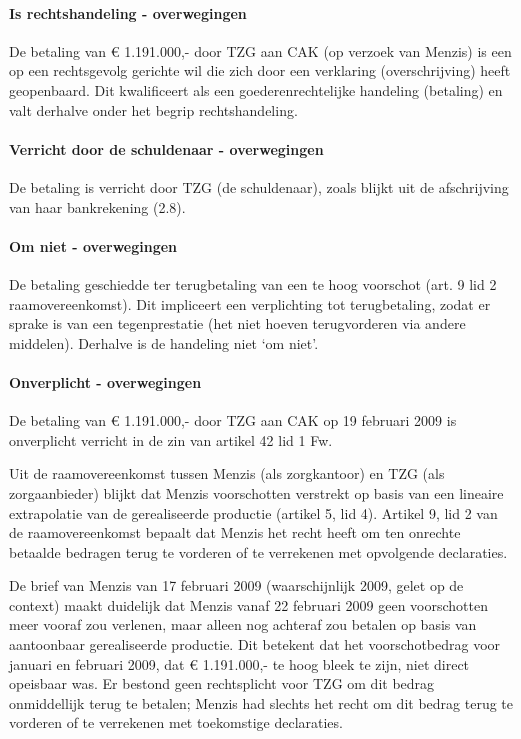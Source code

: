 \documentclass[
  dutch,
  a4paper,
]{article}
\begin{document}
\paragraph{Is rechtshandeling - overwegingen}\label{is-rechtshandeling---overwegingen-87}

De betaling van € 1.191.000,- door TZG aan CAK (op verzoek van Menzis) is een op een rechtsgevolg gerichte wil die zich door een verklaring (overschrijving) heeft geopenbaard. Dit kwalificeert als een goederenrechtelijke handeling (betaling) en valt derhalve onder het begrip rechtshandeling.

\paragraph{Verricht door de schuldenaar - overwegingen}\label{verricht-door-de-schuldenaar---overwegingen-87}

De betaling is verricht door TZG (de schuldenaar), zoals blijkt uit de afschrijving van haar bankrekening (2.8).

\paragraph{Om niet - overwegingen}\label{om-niet---overwegingen-87}

De betaling geschiedde ter terugbetaling van een te hoog voorschot (art. 9 lid 2 raamovereenkomst). Dit impliceert een verplichting tot terugbetaling, zodat er sprake is van een tegenprestatie (het niet hoeven terugvorderen via andere middelen). Derhalve is de handeling niet `om niet'.

\paragraph{Onverplicht - overwegingen}\label{onverplicht---overwegingen-87}

De betaling van € 1.191.000,- door TZG aan CAK op 19 februari 2009 is onverplicht verricht in de zin van artikel 42 lid 1 Fw.

Uit de raamovereenkomst tussen Menzis (als zorgkantoor) en TZG (als zorgaanbieder) blijkt dat Menzis voorschotten verstrekt op basis van een lineaire extrapolatie van de gerealiseerde productie (artikel 5, lid 4). Artikel 9, lid 2 van de raamovereenkomst bepaalt dat Menzis het recht heeft om ten onrechte betaalde bedragen terug te vorderen of te verrekenen met opvolgende declaraties.

De brief van Menzis van 17 februari 2009 (waarschijnlijk 2009, gelet op de context) maakt duidelijk dat Menzis vanaf 22 februari 2009 geen voorschotten meer vooraf zou verlenen, maar alleen nog achteraf zou betalen op basis van aantoonbaar gerealiseerde productie. Dit betekent dat het voorschotbedrag voor januari en februari 2009, dat € 1.191.000,- te hoog bleek te zijn, niet direct opeisbaar was. Er bestond geen rechtsplicht voor TZG om dit bedrag onmiddellijk terug te betalen; Menzis had slechts het recht om dit bedrag terug te vorderen of te verrekenen met toekomstige declaraties.
\end{document}
